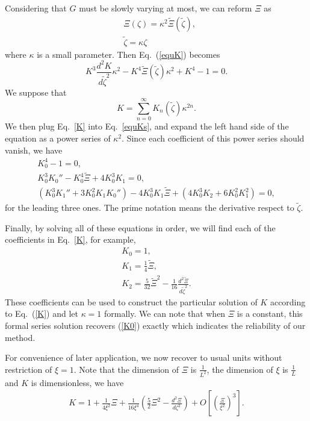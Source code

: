 \documentclass[prd,aps,a4paper,superscriptaddress,onecolumn,nofootinbib]{revtex4}
\begin{document}
Considering that $G$ must be slowly varying at most, we can reform $\Xi$ as
\begin{align}
&\Xi(\zeta)=\kappa^2\tilde{\Xi}(\tilde{\zeta}),\\
&\tilde{\zeta}=\kappa\zeta
\end{align}
where $\kappa$ is a small parameter. Then Eq.~(\ref{equK}) becomes
\begin{equation}\label{equKs}
    K^3\frac{d^2 K}{d \tilde{\zeta}^2}\kappa^2-K^4\tilde{\Xi}(\tilde{\zeta})\kappa^2+K^4-1=0.
\end{equation}
We suppose that
\begin{equation}\label{K}
    K=\sum_{n=0}^\infty K_n(\tilde{\zeta})\kappa^{2n}.
\end{equation}
We then plug Eq.~\eqref{K} into Eq.~\eqref{equKs}, and expand the left hand side of the equation as a power series of $\kappa^2$. Since each coefficient of this power series should vanish, we have
\begin{gather}
    K_0^4-1=0,\\
    K_0^3K_0''-K_0^4\tilde{\Xi}+4K_0^3K_1=0,\\
    (K_0^3K_1''+3K_0^2K_1K_0'')-4K_0^3K_1\tilde{\Xi}+(4K_0^3K_2+6K_0^2K_1^2)=0,
\end{gather}
for the leading three ones. The prime notation means the derivative respect to $\tilde{\zeta}$.

Finally, by solving all of these equations in order, we will find each of the coefficients in Eq.~\eqref{K}, for example,
\begin{gather}
    K_0=1,\\
    K_1=\frac{1}{4}\tilde{\Xi},\\
    K_2=\frac{5}{32}\tilde{\Xi}^2-\frac{1}{16}\frac{d^2\tilde{\Xi}}{d\tilde{\zeta}^2}.
\end{gather}
These coefficients can be used to construct the particular solution of $K$ according to Eq.~(\ref{K}) and let $\kappa=1$ formally. We can note that when $\Xi$ is a constant, this formal series solution recovers (\ref{K0}) exactly which indicates the reliability of our method.

For convenience of later application, we now recover to usual units without restriction of $\xi=1$. Note that the dimension of $\Xi$ is $\frac{1}{L^2}$, the dimension of $\xi$ is $\frac{1}{L}$ and $K$ is dimensionless, we have
\begin{gather}
    K=1+\frac{1}{4\xi^2}\Xi+\frac{1}{16\xi^4}\left(\frac{5}{2}\Xi^2-\frac{d^2\Xi}{d\zeta^2}\right)+O\left[(\frac{\Xi}{\xi^2})^3\right].
\end{gather}
\end{document}
